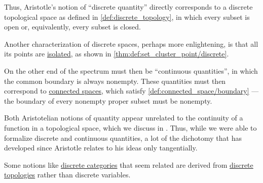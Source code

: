 \begin{concept}
  Thus, Aristotle's notion of \enquote{discrete quantity} directly corresponds to a discrete topological space as defined in \cref{def:discrete_topology}, in which every subset is open or, equivalently, every subset is closed.

  Another characterization of discrete spaces, perhaps more enlightening, is that all its points are \hyperref[def:set_cluster_point]{isolated}, as shown in \cref{thm:def:set_cluster_point/discrete}.

  On the other end of the spectrum must then be \enquote{continuous quantities}, in which the common boundary is always nonempty. These quantities must then correspond to \hyperref[def:connected_space]{connected spaces}, which satisfy \cref{def:connected_space/boundary} --- the boundary of every nonempty proper subset must be nonempty.
\end{concept}
\begin{comments}
  \item Both Aristotelian notions of quantity appear unrelated to the continuity of a function in a topological space, which we discuss in . Thus, while we were able to formalize discrete and continuous quantities, a lot of the dichotomy that has developed since Aristotle relates to his ideas only tangentially.

  \item Some notions like \hyperref[def:discrete_category]{discrete categories} that seem related are derived from \hyperref[def:discrete_topology]{discrete topologies} rather than discrete variables.
\end{comments}

